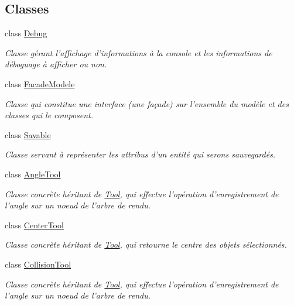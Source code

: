 \subsection*{Classes}
\begin{DoxyCompactItemize}
\item 
class \hyperlink{class_debug}{Debug}
\begin{DoxyCompactList}\small\item\em Classe gérant l'affichage d'informations à la console et les informations de déboguage à afficher ou non. \end{DoxyCompactList}\item 
class \hyperlink{class_facade_modele}{Facade\-Modele}
\begin{DoxyCompactList}\small\item\em Classe qui constitue une interface (une façade) sur l'ensemble du modèle et des classes qui le composent. \end{DoxyCompactList}\item 
class \hyperlink{class_savable}{Savable}
\begin{DoxyCompactList}\small\item\em Classe servant à représenter les attribus d'un entité qui serons sauvegardés. \end{DoxyCompactList}\item 
class \hyperlink{class_angle_tool}{Angle\-Tool}
\begin{DoxyCompactList}\small\item\em Classe concrète héritant de \hyperlink{class_tool}{Tool}, qui effectue l'opération d'enregistrement de l'angle sur un noeud de l'arbre de rendu. \end{DoxyCompactList}\item 
class \hyperlink{class_center_tool}{Center\-Tool}
\begin{DoxyCompactList}\small\item\em Classe concrète héritant de \hyperlink{class_tool}{Tool}, qui retourne le centre des objets sélectionnés. \end{DoxyCompactList}\item 
class \hyperlink{class_collision_tool}{Collision\-Tool}
\begin{DoxyCompactList}\small\item\em Classe concrète héritant de \hyperlink{class_tool}{Tool}, qui effectue l'opération d'enregistrement de l'angle sur un noeud de l'arbre de rendu. \end{DoxyCompactList}\item 

\end{DoxyCompactItemize}

